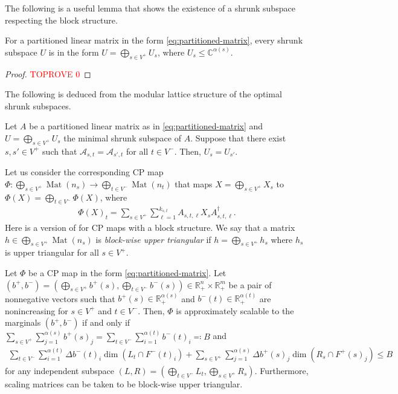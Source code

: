\documentclass[a4paper,11pt]{article}
\numberwithin{equation}{section}
\newcommand{\C}{\mathbb{C}}
\newcommand{\R}{\mathbb{R}}
\newcommand{\caA}{\mathcal{A}}
\DeclareMathOperator{\Mat}{Mat}
\begin{document}
The following is a useful lemma that shows the existence of a shrunk subspace respecting the block structure.

\begin{lemma}\label{lem:partitoned-shrunk}
    For a partitioned linear matrix in the form \eqref{eq:partitioned-matrix},
    every shrunk subspace $U$ is in the form $U = \bigoplus_{s \in V^+} U_s$, where $U_s \leq \C^{\alpha(s)}$.
\end{lemma}
\begin{proof}\textcolor{red}{TOPROVE 0}\end{proof}

The following is deduced from the modular lattice structure of the optimal shrunk subspaces.

\begin{lemma}\label{lem:partitoned-shrunk-rep}
    Let $A$ be a partitioned linear matrix as in \eqref{eq:partitioned-matrix} and $U = \bigoplus_{s \in V^+} U_s$ the minimal shrunk subspace of $A$.
    Suppose that there exist $s, s' \in V^+$ such that $\caA_{s,t} = \caA_{s',t}$ for all $t \in V^-$.
    Then, $U_s = U_{s'}$.
\end{lemma}

Let us consider the corresponding CP map $\Phi: \bigoplus_{s \in V^+}\Mat(n_s) \to \bigoplus_{t \in V^-} \Mat(n_t)$ that maps $X = \bigoplus_{s \in V^+} X_s$ to $\Phi(X) = \bigoplus_{t \in V^-}\Phi(X)$, where
\begin{align}\label{eq:block-CP}
    \Phi(X)_t = \sum_{s \in V^+}\sum_{\ell = 1}^{k_{s,t}} A_{s,t,\ell} X_s A_{s,t,\ell}^\dagger.
\end{align}
Here is a version of  for CP maps with a block structure.
We say that a matrix $h \in \bigoplus_{s \in V^+} \Mat(n_s)$ is \emph{block-wise upper triangular} if $h = \bigoplus_{s \in V^+} h_s$ where $h_s$ is upper triangular for all $s \in V^+$.

\begin{lemma}\label{lem:opscaling-marginals-block}
    Let $\Phi$ be a CP map in the form \eqref{eq:partitioned-matrix}.
    Let $(b^+, b^-) = (\bigoplus_{s \in V^+} b^+(s), \bigoplus_{t \in V^-} b^-(s)) \in \R^n_+ \times \R^m_+$ be a pair of nonnegative vectors such that $b^+(s) \in \R_+^{\alpha(s)}$ and $b^-(t) \in \R_+^{\alpha(t)}$ are nonincreasing for $s \in V^+$ and $t \in V^-$.
    Then, $\Phi$ is approximately scalable to the marginals $(b^+, b^-)$ if and only if $\sum_{s \in V^+}\sum_{j=1}^{\alpha(s)} b^+(s)_j = \sum_{t \in V^-} \sum_{i=1}^{\alpha(t)} b^-(t)_i \eqqcolon B$ and
    \begin{align}
        \sum_{t \in V^-}\sum_{i=1}^{\alpha(t)} \Delta b^-(t)_i \dim(L_t \cap F^-(t)_i) +  \sum_{s \in V^+} \sum_{j=1}^{\alpha(s)} \Delta b^+(s)_j \dim(R_s \cap F^+(s)_j) \leq B
    \end{align}
    for any independent subspace $(L,R) = (\bigoplus_{t \in V^-} L_t, \bigoplus_{s \in V^+} R_s)$.
    Furthermore, scaling matrices can be taken to be block-wise upper triangular.
\end{lemma}
\end{document}
